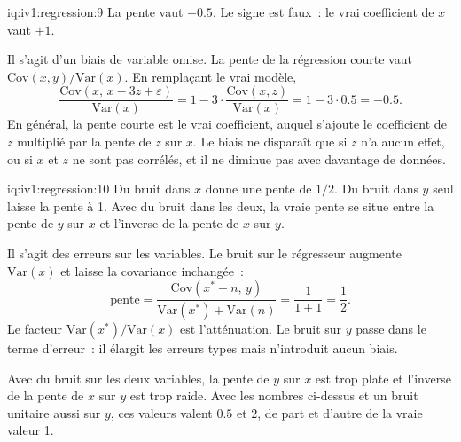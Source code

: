 \begin{solution}{iq:iv1:regression:9}
La pente vaut $-0.5$. Le signe est faux~: le vrai coefficient de $x$ vaut $+1$.

Il s'agit d'un biais de variable omise. La pente de la régression courte vaut $\mathrm{Cov}(x, y)/\mathrm{Var}(x)$. En remplaçant le vrai modèle,
\[
\frac{\mathrm{Cov}(x,\, x - 3z + \varepsilon)}{\mathrm{Var}(x)} = 1 - 3 \cdot \frac{\mathrm{Cov}(x, z)}{\mathrm{Var}(x)} = 1 - 3 \cdot 0.5 = -0.5 .
\]
En général, la pente courte est le vrai coefficient, auquel s'ajoute le coefficient de $z$ multiplié par la pente de $z$ sur $x$. Le biais ne disparaît que si $z$ n'a aucun effet, ou si $x$ et $z$ ne sont pas corrélés, et il ne diminue pas avec davantage de données.

\end{solution}

\begin{solution}{iq:iv1:regression:10}
Du bruit dans $x$ donne une pente de $1/2$. Du bruit dans $y$ seul laisse la pente à 1. Avec du bruit dans les deux, la vraie pente se situe entre la pente de $y$ sur $x$ et l'inverse de la pente de $x$ sur $y$.

Il s'agit des erreurs sur les variables. Le bruit sur le régresseur augmente $\mathrm{Var}(x)$ et laisse la covariance inchangée~:
\[
\text{pente} = \frac{\mathrm{Cov}(x^* + n,\, y)}{\mathrm{Var}(x^*) + \mathrm{Var}(n)} = \frac{1}{1 + 1} = \frac12 .
\]
Le facteur $\mathrm{Var}(x^*)/\mathrm{Var}(x)$ est l'atténuation. Le bruit sur $y$ passe dans le terme d'erreur~: il élargit les erreurs types mais n'introduit aucun biais.

Avec du bruit sur les deux variables, la pente de $y$ sur $x$ est trop plate et l'inverse de la pente de $x$ sur $y$ est trop raide. Avec les nombres ci-dessus et un bruit unitaire aussi sur $y$, ces valeurs valent $0.5$ et $2$, de part et d'autre de la vraie valeur 1.

\end{solution}

